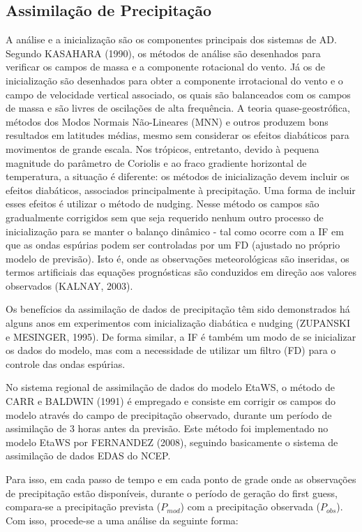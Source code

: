 \subsection{Assimilação de Precipitação}

A análise e a inicialização são os componentes principais dos sistemas de AD. Segundo KASAHARA (1990), os métodos de análise são desenhados para verificar os campos de massa e a componente rotacional do vento. Já os de inicialização são desenhados para obter a componente irrotacional do vento e o campo de velocidade vertical associado, os quais são balanceados com os campos de massa e são livres de oscilações de alta frequência. A teoria quase-geostrófica, métodos dos Modos Normais Não-Lineares (MNN) e outros produzem bons resultados em latitudes médias, mesmo sem considerar os efeitos diabáticos para movimentos de grande escala. Nos trópicos, entretanto, devido à pequena magnitude do parâmetro de Coriolis e ao fraco gradiente horizontal de temperatura, a situação é diferente: os métodos de inicialização devem incluir os efeitos diabáticos, associados principalmente à precipitação. Uma forma de incluir esses efeitos é utilizar o método de nudging. Nesse método os campos são gradualmente corrigidos sem que seja requerido nenhum outro processo de inicialização para se manter o balanço dinâmico - tal como ocorre com a IF em que as ondas espúrias podem ser controladas por um FD (ajustado no próprio modelo de previsão). Isto é, onde as observações meteorológicas são inseridas, os termos artificiais das equações prognósticas são conduzidos em direção aos valores observados (KALNAY, 2003). 

Os benefícios da assimilação de dados de precipitação têm sido demonstrados há alguns anos em experimentos com inicialização diabática e nudging (ZUPANSKI e MESINGER, 1995). De forma similar, a IF é também um modo de se inicializar os dados do modelo, mas com a necessidade de utilizar um filtro (FD) para o controle das ondas espúrias.

No sistema regional de assimilação de dados do modelo EtaWS, o método de CARR e BALDWIN (1991) é empregado e consiste em corrigir os campos do modelo através do campo de precipitação observado, durante um período de assimilação de 3 horas antes da previsão. Este método foi implementado no modelo EtaWS por FERNANDEZ (2008), seguindo basicamente o sistema de assimilação de dados EDAS do NCEP.

Para isso, em cada passo de tempo e em cada ponto de grade onde as observações de precipitação estão disponíveis, durante o período de geração do first guess, compara-se a precipitação prevista ($P_{mod}$) com a precipitação observada ($P_{obs}$). Com isso, procede-se a uma análise da seguinte forma:


